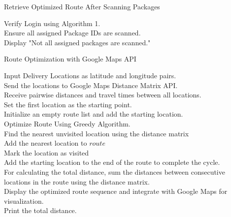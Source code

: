 \documentclass{article}
\begin{document}
\begin{algorithm}[H]
\caption{Retrieve Optimized Route After Scanning Packages}
Verify Login using Algorithm 1.\\
Ensure all assigned Package IDs are scanned.\\
{Display "Not all assigned packages are scanned."}
\end{algorithm}

\begin{algorithm}
\caption{Route Optimization with Google Maps API}
Input Delivery Locations as latitude and longitude pairs.\\
Send the locations to Google Maps Distance Matrix API.\\
Receive pairwise distances and travel times between all locations.\\
Set the first location as the starting point.\\
Initialize an empty route list and add the starting location.\\
Optimize Route Using Greedy Algorithm.\\
{
    Find the nearest unvisited location using the distance matrix\\
    Add the nearest location to $route$\\
    Mark the location as visited\\
}
Add the starting location to the end of the route to complete the cycle.\\
For calculating the total distance, sum the distances between consecutive locations in the route using the distance matrix.\\
Display the optimized route sequence and integrate with Google Maps for visualization.\\
Print the total distance.\\
\end{algorithm}
\end{document}
